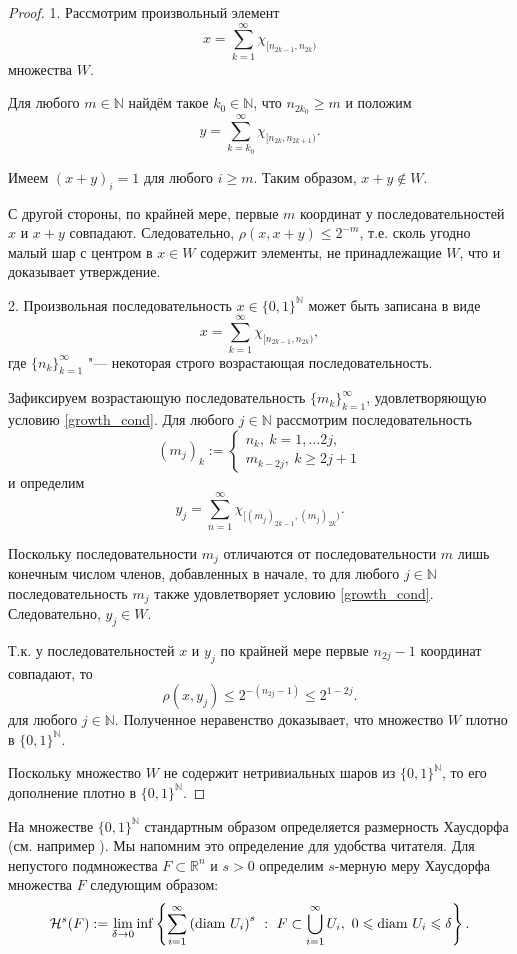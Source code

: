 \documentclass[12pt]{article}
\def\N{{\mathbb{N}}}
\begin{document}
\begin{proof}
1. Рассмотрим произвольный элемент
$$x=\sum_{k=1}^\infty \chi_{[n_{2k-1},n_{2k})}$$
множества $W$.

Для любого $m\in \N$ найдём такое $k_0\in\N$, что $n_{2k_0}\geqslant m$ и положим
$$y=\sum_{k=k_0}^\infty \chi_{[n_{2k},n_{2k+1})}.$$

Имеем $(x+y)_i=1$ для любого $i\geqslant m$. Таким образом, $x+y\notin W$.

С другой стороны, по крайней мере, первые $m$ координат у последовательностей $x$ и $x+y$ совпадают. Следовательно, $\rho(x,x+y)\leqslant2^{-m}$, т.е. сколь угодно малый шар с центром в $x\in W$ содержит элементы, не принадлежащие $W$, что и доказывает утверждение.

2. Произвольная последовательность $x\in\{0,1\}^\N$ может быть записана в виде
$$x=\sum_{k=1}^\infty \chi_{[n_{2k-1},n_{2k})},$$
где $\{n_k\}_{k=1}^\infty$ "--- некоторая строго возрастающая последовательность.

Зафиксируем возрастающую последовательность $\{m_k\}_{k=1}^\infty$, удовлетворяющую условию \eqref{growth_cond}. Для любого $j\in \N$ рассмотрим последовательность
$$(m_j)_k:=
\begin{cases}
n_k, \ k=1,\dots 2j,\\
m_{k-2j}, \ k\geqslant 2j+1
\end{cases}$$
и определим
$$y_j=\sum_{n=1}^\infty \chi_{[(m_j)_{2k-1},(m_j)_{2k})}.$$

Поскольку последовательности $m_j$ отличаются от последовательности $m$ лишь конечным числом членов, добавленных в начале, то для любого $j\in \N$ последовательность $m_j$ также удовлетворяет условию \eqref{growth_cond}. Следовательно, $y_j\in W$.

Т.к. у последовательностей $x$ и $y_j$ по крайней мере первые $n_{2j}-1$ координат совпадают, то
$$\rho(x,y_j)\leqslant2^{-(n_{2j}-1)}\leqslant2^{1-2j}.$$
для любого $j\in \N$. Полученное неравенство доказывает, что множество $W$ плотно в $\{0,1\}^\N$.


Поскольку множество $W$ не содержит нетривиальных шаров из $\{0,1\}^\N$, то его дополнение плотно в $\{0,1\}^\N$.
\end{proof}

На множестве $\{0,1\}^\N$ стандартным образом определяется размерность Хаусдорфа (см. например \cite[Секция 6]{Edgar}). Мы напомним это определение для удобства читателя. Для непустого подмножества $F\subset \mathbb R^n$ и $s > 0$ определим $s$-мерную меру Хаусдорфа множества $F$ следующим образом:
$$\mathcal H^s(F) := \lim_{\delta\to0} \inf \left\{\sum_{i=1}^\infty \left({\rm diam} \ U_i \right)^s \ : \ F\subset \bigcup_{i=1}^\infty  U_i, \  0\leqslant {\rm diam} \ U_i \leqslant \delta \right\}.$$
\end{document}
